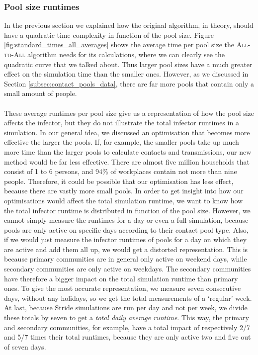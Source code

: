 \subsubsection{Pool size runtimes}
In the previous section we explained how the original algorithm, in theory, should have a quadratic time complexity in function of the pool size. Figure \ref{fig:standard_times_all_averages} shows the average time per pool size the \textsc{All-to-All} algorithm needs for its calculations, where we can clearly see the quadratic curve that we talked about. Thus larger pool sizes have a much greater effect on the simulation time than the smaller ones. However, as we discussed in Section \ref{subsec:contact_pools_data}, there are far more pools that contain only a small amount of people.
\\\\
These average runtimes per pool size give us a representation of how the pool size affects the infector, but they do not illustrate the total infector runtimes in a simulation. In our general idea, we discussed an optimisation that becomes more effective the larger the pools. If, for example, the smaller pools take up much more time than the larger pools to calculate contacts and transmissions, our new method would be far less effective. There are almost five million households that consist of 1 to 6 persons, and 94\% of workplaces contain not more than nine people. Therefore, it could be possible that our optimisation has less effect, because there are vastly more small pools. In order to get insight into how our optimisations would affect the total simulation runtime, we want to know how the total infector runtime is distributed in function of the pool size. However, we cannot simply measure the runtimes for a day or even a full simulation, because pools are only active on specific days according to their contact pool type. Also, if we would just measure the infector runtimes of pools for a day on which they are active and add them all up, we would get a distorted representation. This is because primary communities are in general only active on weekend days, while secondary communities are only active on weekdays. The secondary communities have therefore a bigger impact on the total simulation runtime than primary ones. To give the most accurate representation, we measure seven consecutive days, without any holidays, so we get the total measurements of a `regular' week. At last, because Stride simulations are run per day and not per week, we divide these totals by seven to get a \textit{total daily average runtime}. This way, the primary and secondary communities, for example, have a total impact of respectively 2/7 and 5/7 times their total runtimes, because they are only active two and five out of seven days.
